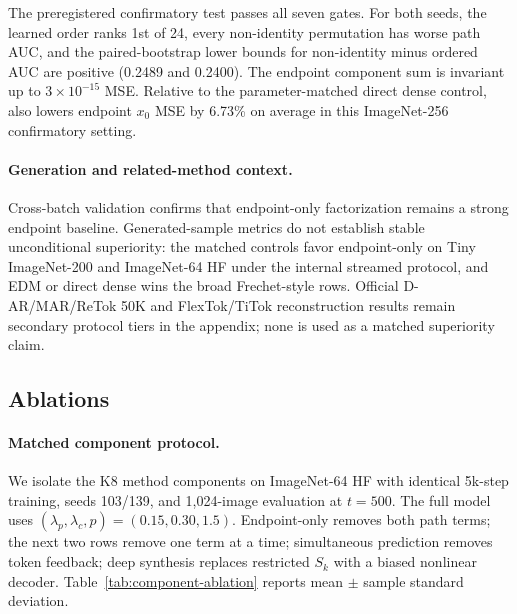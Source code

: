 \begin{table}[t]
  \centering
  \scriptsize
  \caption{ImageNet-256 K4 20k confirmatory order and endpoint results over
  1,024 validation images at $t=500$.}
  \label{tab:imagenet256-confirmatory-order}
\end{table}

The preregistered confirmatory test passes all seven gates. For both seeds, the
learned order ranks 1st of 24, every non-identity permutation has worse path
AUC, and the paired-bootstrap lower bounds for non-identity minus ordered AUC
are positive (0.2489 and 0.2400). The endpoint component sum is invariant up to
$3\times10^{-15}$ MSE. Relative to the parameter-matched direct dense control,
\method{} also lowers endpoint $x_0$ MSE by 6.73\% on average in this
ImageNet-256 confirmatory setting.

\paragraph{Generation and related-method context.}
Cross-batch validation confirms that endpoint-only factorization remains a
strong endpoint baseline. Generated-sample metrics do not establish stable
unconditional superiority: the matched controls favor endpoint-only on Tiny
ImageNet-200 and ImageNet-64 HF under the internal streamed protocol, and EDM
or direct dense wins the broad Frechet-style rows. Official D-AR/MAR/ReTok 50K
and FlexTok/TiTok reconstruction results remain secondary protocol tiers in the
appendix; none is used as a matched \method{} superiority claim.

\subsection{Ablations}

\paragraph{Matched component protocol.}
We isolate the K8 method components on ImageNet-64 HF with identical 5k-step
training, seeds 103/139, and 1,024-image evaluation at $t=500$. The full model
uses $(\lambda_p,\lambda_c,p)=(0.15,0.30,1.5)$. Endpoint-only removes both path
terms; the next two rows remove one term at a time; simultaneous prediction
removes token feedback; deep synthesis replaces restricted $S_k$ with a biased
nonlinear decoder. Table~\ref{tab:component-ablation} reports mean $\pm$ sample
standard deviation.

